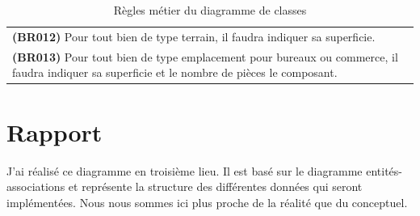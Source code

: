\begin{table}
\begin{tabular}{|p{}|}
  \textbf{(BR012)} Pour tout bien de type \og{}terrain\fg{}, il faudra indiquer sa superficie. \\
  \textbf{(BR013)} Pour tout bien de type \og{}emplacement pour bureaux ou commerce\fg{}, il faudra indiquer sa superficie et le nombre de pièces le composant. \\
  \hline
  \end{tabular}
  \caption{Règles métier du diagramme de classes}
  \label{tbl_business_rules}
\end{table}

\section{Rapport}

J'ai réalisé ce diagramme en troisième lieu. Il est basé sur le diagramme entités-associations et représente la structure des différentes données qui seront implémentées. Nous nous sommes ici plus proche de la réalité que du conceptuel.



